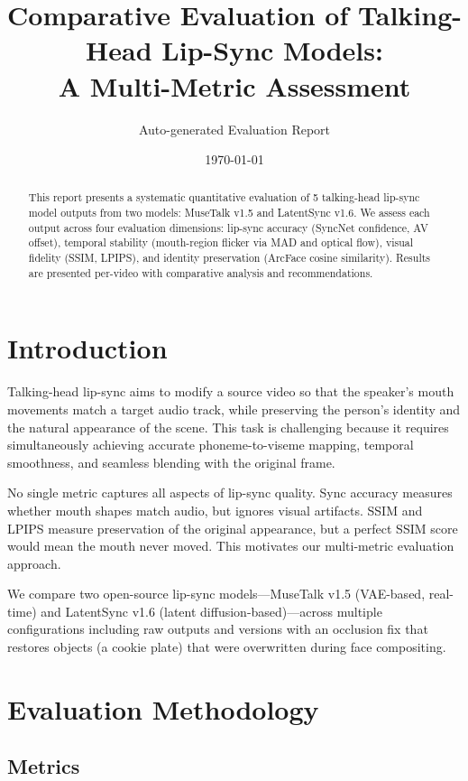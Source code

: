 \documentclass[11pt,a4paper]{article}
\title{Comparative Evaluation of Talking-Head Lip-Sync Models:\\
       A Multi-Metric Assessment}
\author{Auto-generated Evaluation Report}
\date{\today}
\begin{document}
\maketitle

\begin{abstract}
This report presents a systematic quantitative evaluation of 5 talking-head
lip-sync model outputs from two models: MuseTalk v1.5 and LatentSync v1.6.
We assess each output across four evaluation dimensions:
lip-sync accuracy (SyncNet confidence, AV offset), temporal stability
(mouth-region flicker via MAD and optical flow), visual fidelity (SSIM, LPIPS),
and identity preservation (ArcFace cosine similarity). Results are presented
per-video with comparative analysis and recommendations.
\end{abstract}

\section{Introduction}

Talking-head lip-sync aims to modify a source video so that the speaker's
mouth movements match a target audio track, while preserving the person's
identity and the natural appearance of the scene. This task is challenging
because it requires simultaneously achieving accurate phoneme-to-viseme
mapping, temporal smoothness, and seamless blending with the original frame.

No single metric captures all aspects of lip-sync quality. Sync accuracy
measures whether mouth shapes match audio, but ignores visual artifacts.
SSIM and LPIPS measure preservation of the original appearance, but a
perfect SSIM score would mean the mouth never moved. This motivates our
multi-metric evaluation approach.

We compare two open-source lip-sync models---MuseTalk v1.5 (VAE-based,
real-time) and LatentSync v1.6 (latent diffusion-based)---across multiple
configurations including raw outputs and versions with an occlusion fix
that restores objects (a cookie plate) that were overwritten during face
compositing.

\section{Evaluation Methodology}

\subsection{Metrics}
\end{document}
